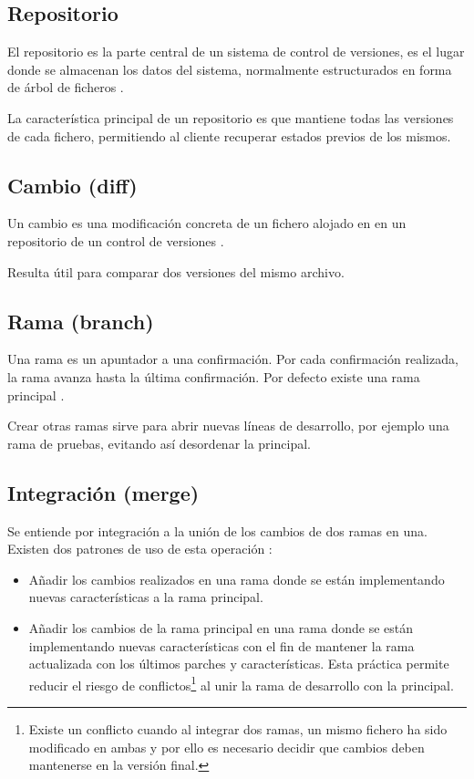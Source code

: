 \subsection{Repositorio}

El repositorio es la parte central de un sistema de control de versiones, es el lugar donde se almacenan los datos del sistema, normalmente estructurados en forma de árbol de ficheros \cite{Pilato:2008:VCS:1435405}.

La característica principal de un repositorio es que mantiene todas las versiones de cada fichero, permitiendo al cliente recuperar estados previos de los mismos.

\subsection{Cambio (diff)}

Un cambio es una modificación concreta de un fichero alojado en en un repositorio de un control de versiones \cite{wiki:002}.

Resulta útil para comparar dos versiones del mismo archivo.

\subsection{Rama (branch)}

Una rama es un apuntador a una confirmación. Por cada confirmación realizada, la rama avanza hasta la última confirmación. Por defecto existe una rama principal \cite{Chacon:2014:PG:2695634}. 

Crear otras ramas sirve para abrir nuevas líneas de desarrollo, por ejemplo una rama de pruebas, evitando así desordenar la principal.

\subsection{Integración (merge)}

Se entiende por integración a la unión de los cambios de dos ramas en una. Existen dos patrones de uso de esta operación \cite{sbf5:git3}:

\begin{itemize}
	\item Añadir los cambios realizados en una rama donde se están implementando nuevas características a la rama principal.
	\item Añadir los cambios de la rama principal en una rama donde se están implementando nuevas características con el fin de mantener la rama actualizada con los últimos parches y características. Esta práctica permite reducir el riesgo de conflictos\footnote{Existe un conflicto cuando al integrar dos ramas, un mismo fichero ha sido modificado en ambas y por ello es necesario decidir que cambios deben mantenerse en la versión final.} al unir la rama de desarrollo con la principal.
\end{itemize}


